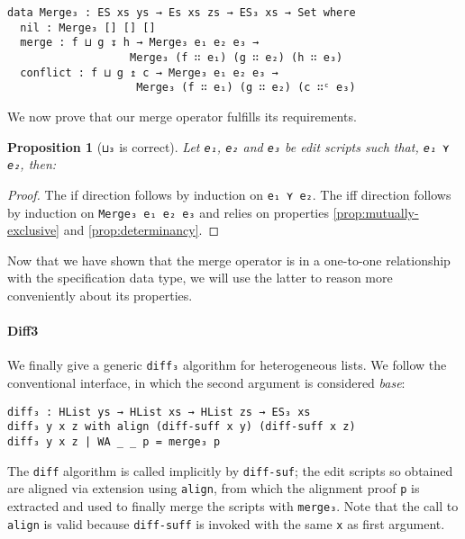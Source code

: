 \documentclass[preprint]{sigplanconf}
\theoremstyle{plain}
\newtheorem{prop}{Proposition}
\begin{document}
\begin{verbatim}
data Merge₃ : ES xs ys → Es xs zs → ES₃ xs → Set where
  nil : Merge₃ [] [] []
  merge : f ⊔ g ↧ h → Merge₃ e₁ e₂ e₃ → 
                   Merge₃ (f ∷ e₁) (g ∷ e₂) (h ∷ e₃)
  conflict : f ⊔ g ↥ c → Merge₃ e₁ e₂ e₃ → 
                    Merge₃ (f ∷ e₁) (g ∷ e₂) (c ∷ᶜ e₃)
\end{verbatim}

        We now prove that our merge operator fulfills its requirements.
\begin{prop}[\texttt{⊔₃} is correct]
\label{prop:merge3-correct}
Let \texttt{e₁}, \texttt{e₂} and \texttt{e₃} be edit scripts such that,
\texttt{e₁ ⋎ e₂}, then:
\end{prop}
\begin{proof}
The if direction follows by induction on \texttt{e₁ ⋎ e₂}.
The iff direction follows by induction on \texttt{Merge₃ e₁ e₂ e₃} and 
relies on properties \ref{prop:mutually-exclusive} and \ref{prop:determinancy}.
\end{proof}
        
        Now that we have shown that the merge operator is in a
        one-to-one relationship with the specification data type, we
        will use the latter to reason more conveniently about its
        properties.

	\paragraph{Diff3}
	We finally give a generic \texttt{diff₃} algorithm for
        heterogeneous lists.
        We follow the conventional interface, in which the second
        argument is considered \emph{base}:
\begin{verbatim}
diff₃ : HList ys → HList xs → HList zs → ES₃ xs
diff₃ y x z with align (diff-suff x y) (diff-suff x z)
diff₃ y x z | WA _ _ p = merge₃ p
\end{verbatim}
	
	The \texttt{diff} algorithm is called implicitly by
        \texttt{diff-suf}; the edit scripts so obtained are aligned
        via extension using \texttt{align}, from which the alignment
        proof \texttt{p} is extracted and used to finally merge the
        scripts with \texttt{merge₃}.  Note that the call to
        \texttt{align} is valid because \texttt{diff-suff} is invoked
        with the same \texttt{x} as first argument.
\end{document}

